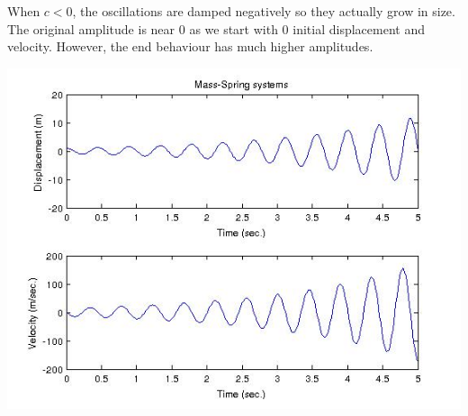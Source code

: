 \documentclass[titlepage]{article}
\begin{document}
\noindent When $c < 0$, the oscillations are damped negatively so they actually grow in size. The original amplitude is near 0 as we start with 0 initial displacement and velocity. However, the end behaviour has much higher amplitudes.

\begin{center}
        \includegraphics[scale=0.6]{matlab/k200c-1.jpg}
\end{center}
\end{document}
